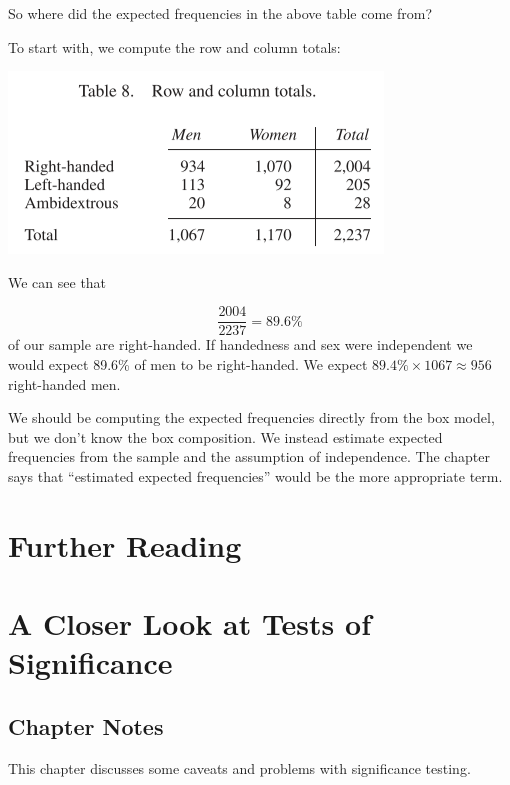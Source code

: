 \documentclass[
]{book}
\begin{document}
So where did the expected frequencies in the above table come from?

To start with, we compute the row and column totals:

\includegraphics{images/Ch28Img06.png}

We can see that

\[
\frac{2004}{2237} = 89.6\%
\]
of our sample are right-handed. If handedness and sex were independent we would expect 89.6\% of men to be right-handed. We expect \(89.4\% \times 1067 \approx 956\) right-handed men.

We should be computing the expected frequencies directly from the box model, but we don't know the box composition. We instead estimate expected frequencies from the sample and the assumption of independence. The chapter says that ``estimated expected frequencies'' would be the more appropriate term.

\hypertarget{further-reading-11}{%
\chapter*{Further Reading}\label{further-reading-11}}

\hypertarget{closer_look}{%
\chapter{A Closer Look at Tests of Significance}\label{closer_look}}

\hypertarget{chapter-notes-28}{%
\section{Chapter Notes}\label{chapter-notes-28}}

This chapter discusses some caveats and problems with significance testing.
\end{document}

